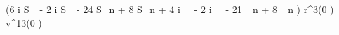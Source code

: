  \left(6 i S_{\lambda} \nu - 2 i S_{\lambda} - 24 S_{n} \nu + 8 S_{n} + 4 i \Sigma_{\lambda} \delta \nu - 2 i \Sigma_{\lambda} \delta - 21 \Sigma_{n} \delta \nu + 8 \Sigma_{n} \delta\right) r^{3}{\left (0 \right )} v^{13}{\left (0 \right )}